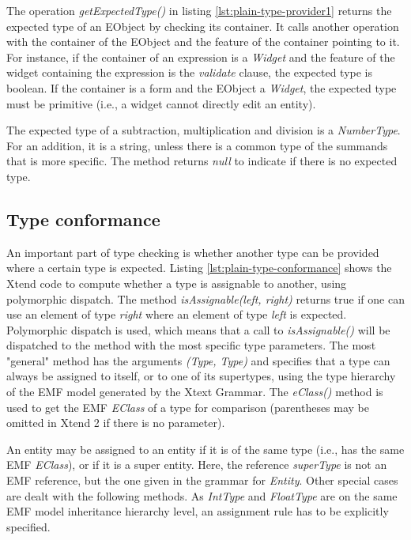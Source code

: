 

The operation \emph{getExpectedType()} in listing \ref{lst:plain-type-provider1}
returns the expected type of an EObject by checking its container. It calls another operation with the container of the EObject and the feature of the container pointing to it. For instance, if the container of an expression is a \emph{Widget} and the feature of the widget containing the expression is the \emph{validate} clause, the expected type is boolean. If the container is a form and the EObject a \emph{Widget}, the expected type must be primitive (i.e., a widget cannot directly edit an entity).

The expected type of a subtraction, multiplication and division is a \emph{NumberType}. For an addition, it is a string, unless there
is a common type of the summands that is more specific. The method returns
\emph{null} to indicate if there is no expected type.

%

\subsection{Type conformance}
An important part of type checking is whether another type can be provided where
a certain type is expected.
Listing \ref{lst:plain-type-conformance} shows the Xtend code to compute whether
a type is assignable to another, using polymorphic dispatch. The method
\emph{isAssignable(left, right)} returns true if one can use an element of
type \emph{right} where an element of type \emph{left} is expected. Polymorphic
dispatch is used, which means that a call to \emph{isAssignable()} will be
dispatched to the method with the most specific type parameters. The most
"general" method has the arguments \emph{(Type, Type)} and specifies that a type
can always be assigned to itself, or to one of its supertypes, using the type
hierarchy of the EMF model generated by the Xtext Grammar. The \emph{eClass()}
method is used to get the EMF \emph{EClass} of a type for comparison
(parentheses may be omitted in Xtend 2 if there is no parameter).

An entity may be assigned to an entity if it is of the same type (i.e., has the
same EMF \emph{EClass}), or if it is a super entity. Here, the reference
\emph{superType} is not an EMF reference, but the one given in the grammar for
\emph{Entity}. Other special cases are dealt with the following methods. As
\emph{IntType} and \emph{FloatType} are on the same EMF model inheritance
hierarchy level, an assignment rule has to be explicitly specified.

